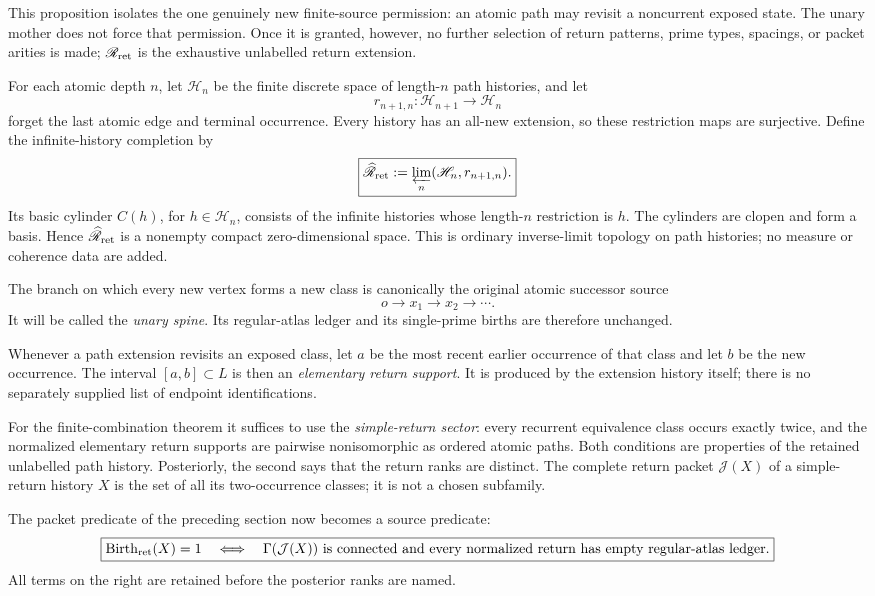 \documentclass[11pt]{article}
\newcommand{\Birth}{\operatorname{Birth}}
\begin{document}
This proposition isolates the one genuinely new finite-source permission:
an atomic path may revisit a noncurrent exposed state.  The unary mother does
not force that permission.  Once it is granted, however, no further selection
of return patterns, prime types, spacings, or packet arities is made;
\(\mathscr R_{\rm ret}\) is the exhaustive unlabelled return extension.

For each atomic depth \(n\), let \(\mathscr H_n\) be the finite discrete space
of length-\(n\) path histories, and let
\[
r_{n+1,n}:\mathscr H_{n+1}\longrightarrow\mathscr H_n
\]
forget the last atomic edge and terminal occurrence.  Every history has an
all-new extension, so these restriction maps are surjective.  Define the
infinite-history completion by
\[
\boxed{
\widehat{\mathscr R}_{\rm ret}
:=
\varprojlim_n(\mathscr H_n,r_{n+1,n}).}
\]
Its basic cylinder \(C(h)\), for \(h\in\mathscr H_n\), consists of the infinite
histories whose length-\(n\) restriction is \(h\).  The cylinders are clopen
and form a basis.  Hence \(\widehat{\mathscr R}_{\rm ret}\) is a nonempty
compact zero-dimensional space.  This is ordinary inverse-limit topology on
path histories; no measure or coherence data are added.

The branch on which every new vertex forms a new class is canonically the
original atomic successor source
\[
o\longrightarrow x_1\longrightarrow x_2\longrightarrow\cdots.
\]
It will be called the \emph{unary spine}.  Its regular-atlas ledger and its
single-prime births are therefore unchanged.

Whenever a path extension revisits an exposed class, let \(a\) be the most
recent earlier occurrence of that class and let \(b\) be the new occurrence.
The interval \([a,b]\subset L\) is then an \emph{elementary return support}.
It is produced by the extension history itself; there is no separately supplied
list of endpoint identifications.

For the finite-combination theorem it suffices to use the \emph{simple-return
sector}: every recurrent equivalence class occurs exactly twice, and the
normalized elementary return supports are pairwise nonisomorphic as ordered
atomic paths.  Both conditions are properties of the retained unlabelled path
history.  Posteriorly, the second says that the return ranks are distinct.  The
complete return packet \(\mathcal J(X)\) of a simple-return history \(X\) is the
set of all its two-occurrence classes; it is not a chosen subfamily.

The packet predicate of the preceding section now becomes a source predicate:
\[
\boxed{
\Birth_{\rm ret}(X)=1
\quad\Longleftrightarrow\quad
\Gamma(\mathcal J(X))\text{ is connected and every normalized return has}
\text{ empty regular-atlas ledger}.}
\]
All terms on the right are retained before the posterior ranks are named.
\end{document}
